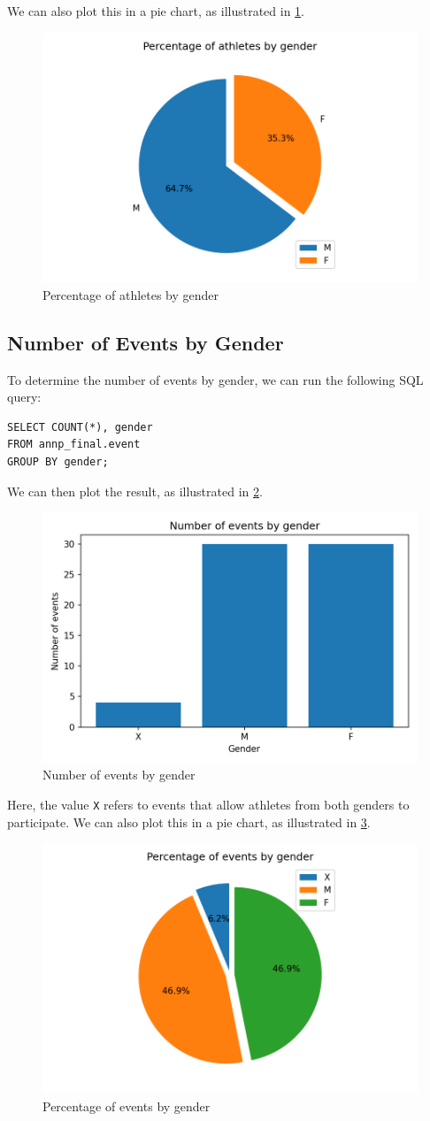 We can also plot this in a pie chart, as illustrated in \cref{fig:athletesbygender-pie}.

\begin{figure}[H]
    \centering
    \includegraphics[width=.45\textwidth]{img/athletesbygender-pie}
    \caption{Percentage of athletes by gender}
    \label{fig:athletesbygender-pie}
\end{figure}

\subsection{Number of Events by Gender}\label{subsec:number-of-events-by-gender}

To determine the number of events by gender, we can run the following SQL query:

\begin{verbatim}
SELECT COUNT(*), gender
FROM annp_final.event
GROUP BY gender;
\end{verbatim}

We can then plot the result, as illustrated in \cref{fig:eventsbygender}.

\begin{figure}[H]
    \centering
    \includegraphics[width=.35\textwidth]{img/eventsbygender}
    \caption{Number of events by gender}
    \label{fig:eventsbygender}
\end{figure}

Here, the value \texttt{X} refers to events that allow athletes from both genders to participate.
We can also plot this in a pie chart, as illustrated in \cref{fig:eventsbygender-pie}.

\begin{figure}[H]
    \centering
    \includegraphics[width=.45\textwidth]{img/eventsbygender-pie}
    \caption{Percentage of events by gender}
    \label{fig:eventsbygender-pie}
\end{figure}

